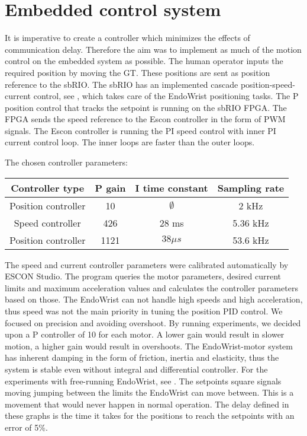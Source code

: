 \section{Embedded control system}



It is imperative to create a controller which minimizes the effects of communication delay. Therefore the aim was to implement as much of the motion control on the embedded system as possible. The human operator  inputs the required position by moving the GT. These positions are sent as position reference to the sbRIO. 
The sbRIO has an implemented cascade position-speed-current control, see , which takes care of the EndoWrist positioning tasks. The P position control that tracks the setpoint is running on the sbRIO FPGA. The FPGA sends the speed reference to the Escon controller in the form of PWM signals. The Escon controller is running the PI speed control with inner PI current control loop. The inner loops are faster than the outer loops.

The chosen controller parameters:

\begin{center}
	\begin{tabular}{ c | c | c | c }
		\hline
		Controller type & P gain & I time constant & Sampling rate \\ \hline
		Position controller & 10 & $\emptyset$ & 2 kHz \\ \hline
		Speed controller & 426 & 28 ms & 5.36 kHz \\ \hline
		Position controller & 1121 & $38 \mu s$ & 53.6 kHz \\ \hline
	\end{tabular}
\end{center}

The speed and current controller parameters were calibrated automatically by ESCON Studio. The program queries the motor parameters, desired current limits and maximum acceleration values and calculates the controller parameters based on those. The EndoWrist can not handle high speeds and high acceleration, thus speed was not the main priority in tuning the position PID control. We focused on precision and avoiding overshoot. By running experiments, we decided upon a P controller of 10 for each motor. A lower gain would result in slower motion, a higher gain would result in overshoots. The EndoWrist-motor system has inherent damping in the form of friction, inertia and elasticity, thus the system is stable even without integral and differential controller. For the experiments with free-running EndoWrist, see . The setpoints square signals moving jumping between the limits the EndoWrist can move between. This is a movement that would never happen in normal operation. The delay defined in these graphs is the time it takes for the positions to reach the setpoints with an error of 5\%.

